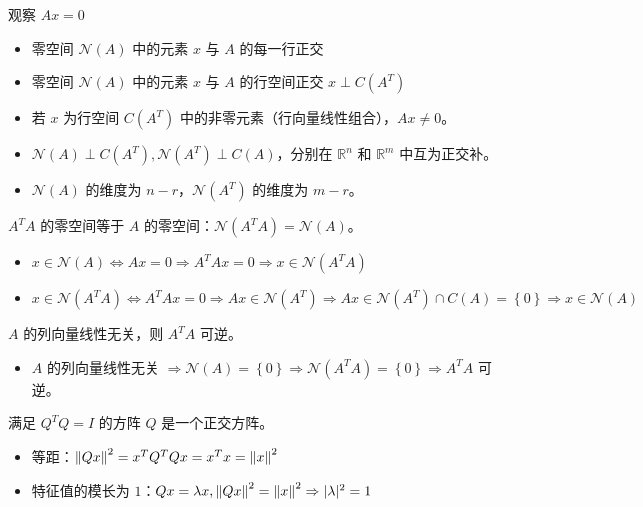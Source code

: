 \begin{remark}
    观察 $Ax = 0$
    \begin{itemize}
        \item 零空间 $\mathcal{N}(A)$ 中的元素 $x$ 与 $A$ 的每一行正交
        \item 零空间 $\mathcal{N}(A)$ 中的元素 $x$ 与 $A$ 的行空间正交 $x \perp C(A^T)$
        \item 若 $x$ 为行空间 $C(A^T)$ 中的非零元素（行向量线性组合），$Ax \neq 0$。
        \item $\mathcal{N}(A) \perp C(A^T), \mathcal{N}(A^T) \perp C(A)$，分别在 $\mathbb{R}^n$ 和 $\mathbb{R}^m$ 中互为正交补。
        \item $\mathcal{N}(A)$ 的维度为 $n - r$，$\mathcal{N}(A^T)$ 的维度为 $m - r$。
    \end{itemize}
\end{remark}

\begin{remark}
	$A^TA$ 的零空间等于 $A$ 的零空间：$\mathcal{N}(A^TA) = \mathcal{N}(A)$。
	\begin{itemize}
		\item $x\in\mathcal{N}(A) \Leftrightarrow Ax=0 \Rightarrow A^TAx=0 \Rightarrow x \in \mathcal{N}(A^TA)$
		\item $x \in \mathcal{N}(A^TA)\Leftrightarrow A^TAx = 0 \Rightarrow Ax \in \mathcal{N}(A^T) \Rightarrow Ax \in \mathcal{N}(A^T)\cap C(A)=\left\{0\right\} \Rightarrow x\in \mathcal{N}(A)$
	\end{itemize}
\end{remark}

\begin{remark}
	$A$ 的列向量线性无关，则 $A^TA$ 可逆。
	\begin{itemize}
		\item $A$ 的列向量线性无关 $\Rightarrow \mathcal{N}(A) = \left\{0\right\}\Rightarrow \mathcal{N}(A^TA) = \left\{0\right\}\Rightarrow A^TA$ 可逆。
	\end{itemize}
\end{remark}

\begin{remark}
    满足 $Q^TQ = I$ 的方阵 $Q$ 是一个正交方阵。
    \begin{itemize}
        \item 等距：$\norm{Qx}^2 = x^TQ^TQx = x^Tx = \norm{x}^2$
        \item 特征值的模长为 $1$：$Qx = \lambda x, \norm{Qx}^2 = \norm{x}^2\Rightarrow |\lambda|^2 = 1$
    \end{itemize}
\end{remark}


